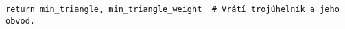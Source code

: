 \begin{mdframed}[style=MyFrame]
\begin{lstlisting}[style=metoo]
  return min_triangle, min_triangle_weight  # Vrátí trojúhelník a jeho obvod.
\end{lstlisting}
\end{mdframed}
